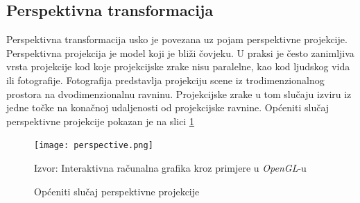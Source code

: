 \documentclass[times, zavrsni, numeric, utf8]{fer}
\newcommand{\source}[1]{\caption*{Izvor: {#1}} }
\begin{document}
\subsection{Perspektivna transformacija}
\label{schap:persp}
\hspace*{0.5cm}Perspektivna transformacija usko je povezana uz pojam perspektivne projekcije. Perspektivna projekcija je model koji je bliži čovjeku. U praksi je često zanimljiva vrsta projekcije kod koje projekcijske zrake nisu paralelne, kao kod ljudskog vida ili fotografije. Fotografija predstavlja projekciju scene iz trodimenzionalnog prostora na dvodimenzionalnu ravninu. Projekcijske zrake u tom slučaju izviru iz jedne točke na konačnoj udaljenosti od projekcijske ravnine. Općeniti slučaj perspektivne projekcije pokazan je na slici \ref{fig:perspective}
\begin{figure}[H]
  \texttt{[image: perspective.png]}
  \caption{Općeniti slučaj perspektivne projekcije}
  \label{fig:perspective}
  \source{Interaktivna računalna grafika kroz primjere u \textit{OpenGL}-u\cite{cupicmihajlovic} }
\end{figure}
\end{document}

